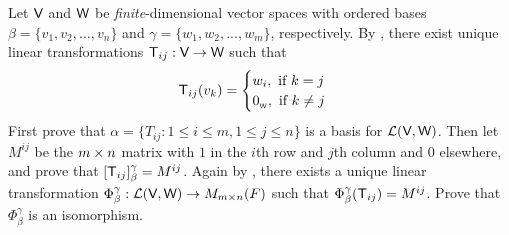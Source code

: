 \begin{exercise} \label{exercise 2.4.21}
Let \(\textsf{V}\) and \(\textsf{W}\) be \emph{finite}-dimensional vector spaces with ordered bases \(\beta = \{ v_1, v_2, ..., v_n \}\) and \(\gamma = \{ w_1, w_2, ..., w_m \}\), respectively.
By , there exist unique linear transformations \(\textsf{T}_{ij} : \textsf{V} \to \textsf{W}\) such that
\begin{equation*}
    \textsf{T}_{ij}(v_k) = \begin{cases}
        w_i, \text{ if } k = j \\
        0_{_{\textsf{W}}}, \text{ if } k \ne j
    \end{cases}
\end{equation*}
First prove that \(\alpha = \{ T_{ij} : 1 \le i \le m, 1 \le j \le n \}\) is a basis for \(\mathcal{L}(\textsf{V}, \textsf{W})\).
Then let \(M^{ij}\) be the \(m \times n\) matrix with \(1\) in the \(i\)th row and \(j\)th column and \(0\) elsewhere, and prove that \([\textsf{T}_{ij}]_{\beta}^{\gamma} = M^{ij}\).
Again by , there exists a unique linear transformation \(\Phi_{\beta}^{\gamma} : \mathcal{L}(\textsf{V}, \textsf{W}) \to M_{m \times n}(F)\) such that \(\Phi_{\beta}^{\gamma} (\textsf{T}_{ij}) = M^{ij}\).
Prove that \(\Phi_{\beta}^{\gamma}\) is an isomorphism.
\end{exercise}

